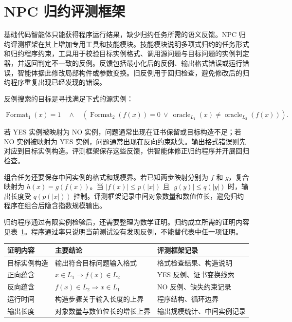 \section{NPC 归约评测框架}

基础代码智能体只能获得程序运行结果，缺少归约任务所需的语义反馈。NPC 归约评测框架在其上增加专用工具和技能模块。技能模块说明多项式归约的任务形式和归约程序约束，工具用于校验目标实例格式、调用源问题与目标问题的实例判定器，并返回判定不一致的反例。反馈包括最小化后的反例、输出格式错误或运行错误，智能体据此修改局部构件或参数变换。旧反例用于回归检查，避免修改后的归约程序重复出现已经发现的错误。

反例搜索的目标是寻找满足下式的源实例：

\begin{equation}
    \operatorname{Format}_1(x)=1
    \quad\land\quad
    \left(
    \operatorname{Format}_2(f(x))=0
    \ \lor\
    \operatorname{oracle}_{L_1}(x)
    \neq
    \operatorname{oracle}_{L_2}(f(x))
    \right).
    \label{eq:counterexample-objective}
\end{equation}

若 YES 实例被映射为 NO 实例，问题通常出现在证书保留或目标构造不足；若 NO 实例被映射为 YES 实例，问题通常出现在反向约束缺失。输出格式错误则先对应到目标实例构造。评测框架保存这些反馈，供智能体修正归约程序并开展回归检查。

组合任务还要保存中间实例的格式和规模界。若已知两步映射分别为 \(f\) 和 \(g\)，复合映射为 \(h(x)=g(f(x))\)。当 \(|f(x)|\leq p(|x|)\) 且 \(|g(y)|\leq q(|y|)\) 时，输出长度受 \(q(p(|x|))\) 控制。评测框架记录中间对象数量和数值位长，避免归约程序在组合后隐含指数规模输出。

归约程序通过有限实例检验后，还需要整理为数学证明。归约成立所需的证明内容见表~\ref{tab:reduction-proof-requirements}。程序通过率只说明当前测试没有发现反例，不能替代表中任一项证明。

\begin{table}[!htbp]
    \label{tab:reduction-proof-requirements}
    \centering
    \footnotesize
    \setlength{\tabcolsep}{4pt}
    \renewcommand{\arraystretch}{1.05}
    \begin{tabular}{lp{}p{}}
        \hline
        证明内容 & 主要结论 & 评测框架记录\\
        \hline
        目标实例构造 & 输出符合目标问题输入格式 & 格式检查结果、构造说明\\
        正向蕴含 & \(x\in L_1\Rightarrow f(x)\in L_2\) & YES 反例、证书变换线索\\
        反向蕴含 & \(f(x)\in L_2\Rightarrow x\in L_1\) & NO 反例、缺失约束记录\\
        运行时间 & 构造步骤关于输入长度的上界 & 程序结构、循环边界\\
        输出长度 & 对象数量与数值位长的增长上界 & 输出规模统计、中间实例记录\\
        \hline
    \end{tabular}
\end{table}


